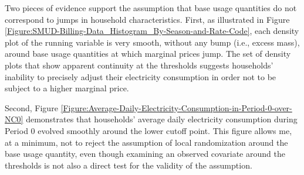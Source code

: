 Two pieces of evidence support the assumption that base usage quantities do not correspond to jumps in household characteristics. First, as illustrated in Figure \ref{Figure:SMUD-Billing-Data_Histogram_By-Season-and-Rate-Code}, each density plot of the running variable is very smooth, without any bump (i.e., excess mass), around base usage quantities at which marginal prices jump. The set of density plots that show apparent continuity at the thresholds suggests households' inability to precisely adjust their electricity consumption in order not to be subject to a higher marginal price. 

Second, Figure \ref{Figure:Average-Daily-Electricity-Consumption-in-Period-0-over-NC0} demonstrates that households' average daily electricity consumption during Period 0 evolved smoothly around the lower cutoff point. This figure allows me, at a minimum, not to reject the assumption of local randomization around the base usage quantity, even though examining an observed covariate around the thresholds is not also a direct test for the validity of the assumption.
